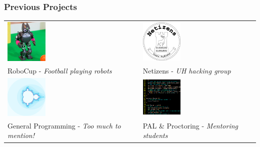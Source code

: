 \documentclass[10pt]{beamer}
\begin{document}
  \begin{frame}
    \frametitle{Previous Projects}
    \centering
    \begin{tabular}{p{4cm} p{4cm}}
      \includegraphics[width=2cm,keepaspectratio]{robocup.png}     &
      \includegraphics[width=2cm,keepaspectratio]{netizens.png}   \\
      RoboCup - \emph{Football playing robots}                     &
      Netizens - \emph{UH hacking group}                          \\
      \includegraphics[width=2cm,keepaspectratio]{mandelbrot.png}  &
      \includegraphics[width=2cm,keepaspectratio]{palproctor.png} \\
      General Programming - \emph{Too much to mention!}            &
      PAL \& Proctoring - \emph{Mentoring students}               \\
    \end{tabular}
  \end{frame}
\end{document}
